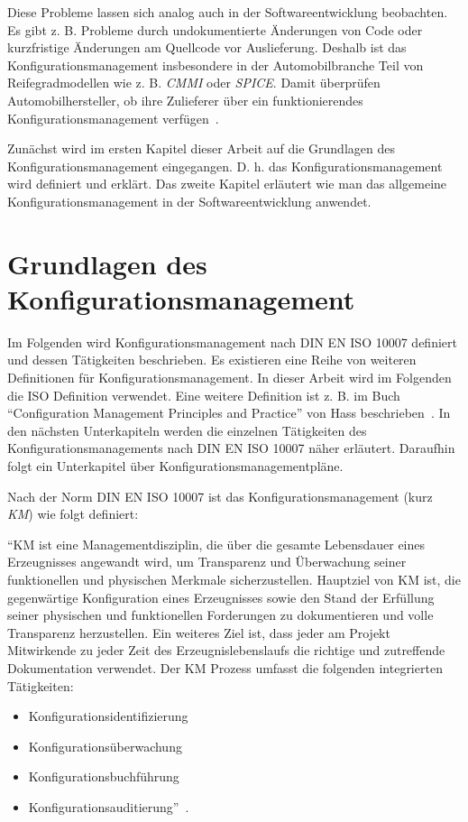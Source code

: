 \documentclass[runningheads,a4paper]{uwsese}
\begin{document}
Diese Probleme lassen sich analog auch in der Softwareentwicklung beobachten.
Es gibt z. B. Probleme durch undokumentierte Änderungen von Code oder
kurzfristige Änderungen am Quellcode vor Auslieferung. Deshalb ist das
Konfigurationsmanagement insbesondere in der
Automobilbranche Teil von Reifegradmodellen wie z. B. {\em CMMI} oder
{\em SPICE}. Damit überprüfen Automobilhersteller, ob ihre Zulieferer über ein
funktionierendes Konfigurationsmanagement verfügen~\cite[S. 2f]{weischedel2002}.

Zunächst wird im ersten Kapitel dieser Arbeit auf die Grundlagen des
Konfigurationsmanagement eingegangen. D. h. das Konfigurationsmanagement wird
definiert und erklärt.
Das zweite Kapitel erläutert wie man das allgemeine Konfigurationsmanagement in
der Softwareentwicklung anwendet.

\section{Grundlagen des Konfigurationsmanagement}
Im Folgenden wird Konfigurationsmanagement nach DIN EN ISO 10007 definiert und
dessen Tätigkeiten beschrieben. Es existieren eine Reihe von weiteren
Definitionen für Konfigurationsmanagement.
In dieser Arbeit wird im Folgenden die ISO Definition verwendet. Eine weitere
Definition ist z. B. im Buch ``Configuration Management Principles and
Practice'' von Hass beschrieben~\cite{Hass:2003:CMP:582584}. In den nächsten
Unterkapiteln werden die einzelnen Tätigkeiten des Konfigurationsmanagements
nach DIN EN ISO 10007 näher erläutert. Daraufhin folgt ein Unterkapitel über
Konfigurationsmanagementpläne.

Nach der Norm DIN EN ISO 10007 ist das Konfigurationsmanagement (kurz {\em KM})
wie folgt definiert:

``KM ist eine Managementdisziplin, die über die gesamte Lebensdauer eines
Erzeugnisses angewandt wird, um Transparenz und Überwachung seiner funktionellen
und physischen Merkmale sicherzustellen. Hauptziel von KM ist, die
gegenwärtige Konfiguration eines Erzeugnisses sowie den Stand der Erfüllung
seiner physischen und funktionellen Forderungen zu dokumentieren und volle
Transparenz herzustellen. Ein weiteres Ziel ist, dass jeder am Projekt
Mitwirkende zu jeder Zeit des Erzeugnislebenslaufs die richtige und zutreffende
Dokumentation verwendet. Der KM Prozess umfasst die folgenden integrierten
Tätigkeiten:

\begin{itemize}
	\item Konfigurationsidentifizierung
	\item Konfigurationsüberwachung
	\item Konfigurationsbuchführung
	\item Konfigurationsauditierung''~\cite{ISO10007}.
\end{itemize}
\end{document}

